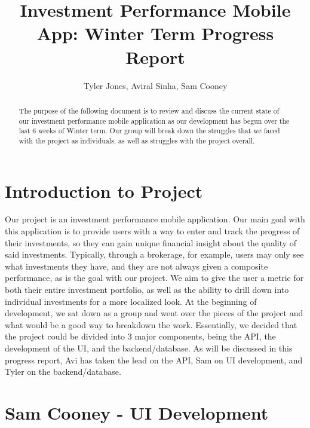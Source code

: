 \documentclass[letterpaper,10pt,titlepage,journal,compsoc,draftclsnofoot,onecolumn]{IEEEtran}
\title{Investment Performance Mobile App: Winter Term Progress Report}
\author{Tyler Jones, Aviral Sinha, Sam Cooney}
\newcommand\tab[1][1cm]{\hspace*{#1}}
\begin{document}
\begin{titlingpage}
    \maketitle
	\centering{}
    \begin{abstract}
        
     The purpose of the following document is to review and discuss the current state of our investment performance mobile application as our development has begun over the last 6 weeks of Winter term. Our group will break down the struggles that we faced with the project as individuals, as well as struggles with the project overall.
        
    \end{abstract}
\end{titlingpage}

\newpage

\tableofcontents{}

\newpage

\section{Introduction to Project}

\tab Our project is an investment performance mobile application. Our main goal with this application is to provide users with a way to enter and track the progress of their investments, so they can gain unique financial insight about the quality of said investments. Typically, through a brokerage, for example, users may only see what investments they have, and they are not always given a composite performance, as is the goal with our project. We aim to give the user a metric for both their entire investment portfolio, as well as the ability to drill down into individual investments for a more localized look. At the beginning of development, we sat down as a group and went over the pieces of the project and what would be a good way to breakdown the work. Essentially, we decided that the project could be divided into 3 major components, being the API, the development of the UI, and the backend/database. As will be discussed in this progress report, Avi has taken the lead on the API, Sam on UI development, and Tyler on the backend/database.

\section{Sam Cooney - UI Development}
\end{document}
